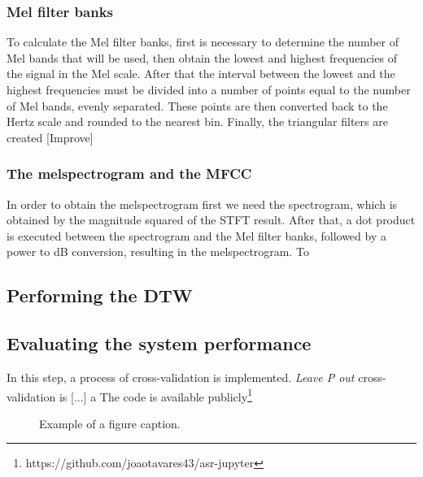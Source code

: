 \documentclass[conference]{IEEEtran}
\begin{document}
\subsubsection{Mel filter banks}
To calculate the Mel filter banks, first is necessary to determine the number of 
Mel bands that will be used, then obtain the lowest and highest frequencies of 
the signal in the Mel scale. After that the interval between the lowest and the 
highest frequencies must be divided into a number of points equal to the number 
of Mel bands, evenly separated. These points are then converted back to the Hertz 
scale and rounded to the nearest bin. Finally, the triangular filters are created [Improve]
\subsubsection{The melspectrogram and the MFCC}
In order to obtain the melspectrogram first we need the spectrogram, which is obtained
by the magnitude squared of the \ac{STFT} result. After that, a dot product is executed between
the spectrogram and the Mel filter banks, followed by a power to dB conversion, resulting in 
the melspectrogram. To 
\subsection{Performing the DTW}

\subsection{Evaluating the system performance}
In this step, a process of cross-validation is implemented. \textit{Leave P out} 
cross-validation is [...]
a The code is available publicly\footnote{https://github.com/joaotavares43/asr-jupyter}

\begin{figure}[htbp]
\caption{Example of a figure caption.}
\label{fig}
\end{figure}



\end{document}
